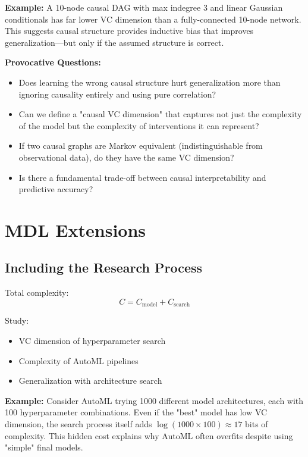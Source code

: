   \textbf{Example:} A 10-node causal DAG with max indegree 3 and linear
  Gaussian conditionals has far lower VC dimension than a fully-connected
  10-node network. This suggests causal structure provides inductive bias
  that improves generalization—but only if the assumed structure is correct.

  \textbf{Provocative Questions:}
  \begin{itemize}
    \item Does learning the wrong causal structure hurt generalization more
      than ignoring causality entirely and using pure correlation?

    \item Can we define a "causal VC dimension" that captures not just the
      complexity of the model but the complexity of interventions it can
      represent?

    \item If two causal graphs are Markov equivalent (indistinguishable
      from observational data), do they have the same VC dimension?

    \item Is there a fundamental trade-off between causal interpretability
      and predictive accuracy?
  \end{itemize}

  \section{MDL Extensions}

  \subsection*{Including the Research Process}

  Total complexity:
  $$
    C = C_{\text{model}}+ C_{\text{search}}
  $$

  Study:
  \begin{itemize}
    \item VC dimension of hyperparameter search

    \item Complexity of AutoML pipelines

    \item Generalization with architecture search
  \end{itemize}

  \textbf{Example:} Consider AutoML trying 1000 different model
  architectures, each with 100 hyperparameter combinations. Even if the
  "best" model has low VC dimension, the search process itself adds $\log
  (1000 \times 100) \approx 17$ bits of complexity. This hidden cost
  explains why AutoML often overfits despite using "simple" final models.


